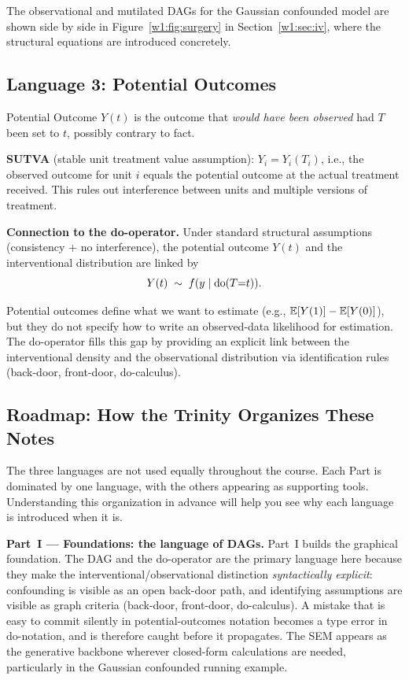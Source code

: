 \documentclass[master.tex]{subfiles}
\begin{document}
The observational and mutilated DAGs for the Gaussian confounded model are shown
side by side in Figure~\ref{w1:fig:surgery} in Section~\ref{w1:sec:iv}, where the structural
equations are introduced concretely.

\subsection{Language 3: Potential Outcomes}

\begin{defn}{Potential Outcome \citep{rubin1974estimating}}
$Y(t)$ is the outcome that \emph{would have been observed} had $T$ been set
to $t$, possibly contrary to fact.

\medskip\noindent
\textbf{SUTVA} (stable unit treatment value assumption): $Y_i = Y_i(T_i)$,
i.e., the observed outcome for unit $i$ equals the potential outcome at the
actual treatment received.  This rules out interference between units and
multiple versions of treatment.
\end{defn}

\noindent\textbf{Connection to the do-operator.}
Under standard structural assumptions (consistency + no interference), the
potential outcome $Y(t)$ and the interventional distribution are linked by
\[
  Y(t) \;\sim\; f(y \mid \mathrm{do}(T{=}t)).
\]

\begin{remark}
Potential outcomes define what we want to estimate
(e.g., $\mathbb{E}[Y(1)] - \mathbb{E}[Y(0)]$), but they do not specify how to write an
observed-data likelihood for estimation.  The do-operator fills this gap by
providing an explicit link between the interventional density and the
observational distribution via identification rules (back-door, front-door,
do-calculus).
\end{remark}

\subsection{Roadmap: How the Trinity Organizes These Notes}

The three languages are not used equally throughout the course.  Each
Part is dominated by one language, with the others appearing as
supporting tools.  Understanding this organization in advance will help
you see why each language is introduced when it is.

\medskip
\noindent\textbf{Part~I --- Foundations: the language of DAGs.}
Part~I builds the graphical foundation.  The DAG and the do-operator
are the primary language here because they make the
interventional/observational distinction \emph{syntactically explicit}:
confounding is visible as an open back-door path, and identifying
assumptions are visible as graph criteria (back-door, front-door,
do-calculus).  A mistake that is easy to commit silently in
potential-outcomes notation becomes a type error in do-notation, and is
therefore caught before it propagates.  The SEM appears as the
generative backbone wherever closed-form calculations are needed,
particularly in the Gaussian confounded running example.
\end{document}
